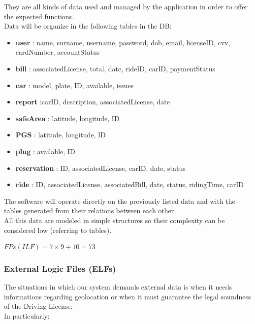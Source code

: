 \documentclass[english]{article}
\begin{document}
They are all kinds of data used and managed by the application in  order to offer the expected functions.\\
Data will be organize in the following tables in the DB:
\begin{itemize}
\item \textbf{user} : name, surname, username, password, dob, email, licenseID, cvv, cardNumber, accountStatus

\item \textbf{bill} : associatedLicense, total, date, rideID, carID, paymentStatus

\item \textbf{car} : model, plate, ID, available, issues

\item \textbf{report} :carID, description, associatedLicense, date

\item \textbf{safeArea} : latitude, longitude, ID


\item \textbf{PGS} : latitude, longitude, ID

\item \textbf{plug} : available, ID

\item \textbf{reservation} : ID, associatedLicense, carID, date, status

\item \textbf{ride} : ID, associatedLicense, associatedBill, date, status, ridingTime, carID

\end{itemize}
The software will operate directly on the previously listed data and with the tables generated from their relations between each other.\\
All this data are modeled in simple structures so their complexity can be considered low (referring to tables).

\begin{center}
$ FPs (ILF) = 7 \times 9 + 10= 73 $
\end{center}

\subsubsection{External Logic Files (ELFs)}

The situations in which our system demands external data is when it needs informations regarding geolocation or when it must guarantee the legal soundness of the Driving License.\\
In particularly:
\end{document}
